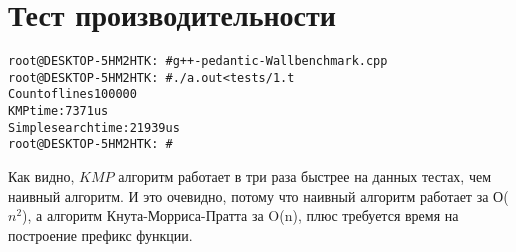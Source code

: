 \section{Тест производительности}

\begin{alltt}
root@DESKTOP-5HM2HTK:~# g++ -pedantic -Wall benchmark.cpp
root@DESKTOP-5HM2HTK:~# ./a.out <tests/1.t
Count of lines 100000
KMP time: 7371us
Simple search time: 21939us
root@DESKTOP-5HM2HTK:~#
\end{alltt}

Как видно, $KMP$ алгоритм работает в три раза быстрее на данных тестах, чем наивный алгоритм. И это очевидно, потому что наивный алгоритм работает за О($n^2$), а алгоритм Кнута-Морриса-Пратта за O(n), плюс требуется время на построение префикс функции.

\pagebreak


